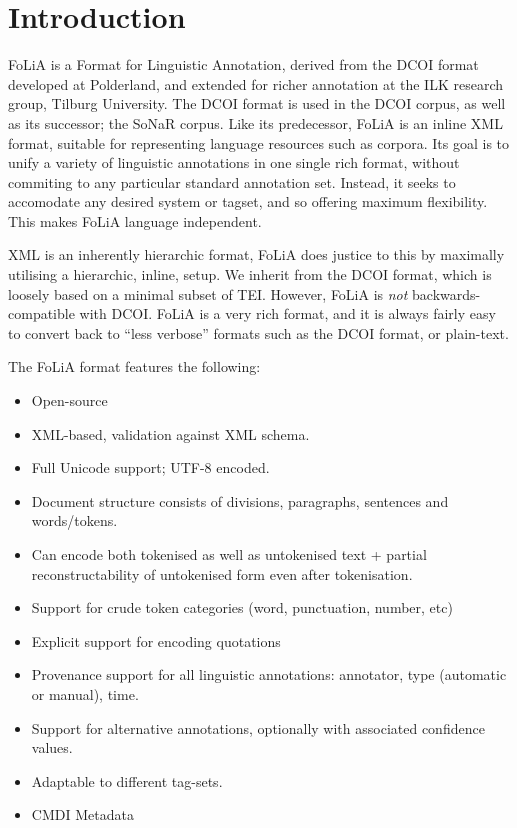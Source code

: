 \section{Introduction}


FoLiA is a Format for Linguistic Annotation, derived from the DCOI\cite{DCOI} format developed at Polderland, and extended for richer annotation at the ILK research group, Tilburg University. The DCOI format is used in the DCOI corpus, as well as its successor; the SoNaR corpus. Like its predecessor, FoLiA is an inline XML format, suitable for representing language resources such as corpora. Its goal is to unify a variety of linguistic annotations in one single rich format, without commiting to any particular standard annotation set. Instead, it seeks to accomodate any desired system or tagset, and so offering maximum flexibility. This makes FoLiA language independent.

XML is an inherently hierarchic format, FoLiA does justice to this by maximally utilising a hierarchic, inline, setup. We inherit from the DCOI format, which is loosely based on a minimal subset of TEI. However, FoLiA is \emph{not} backwards-compatible with DCOI. FoLiA is a very rich format, and it is always fairly easy to convert back to ``less verbose'' formats such as the DCOI format, or plain-text. 

The FoLiA format features the following:

\begin{itemize}
\item Open-source
\item XML-based, validation against XML schema.
\item Full Unicode support; UTF-8 encoded.
\item Document structure consists of divisions, paragraphs, sentences and words/tokens.
\item Can encode both tokenised as well as untokenised text + partial reconstructability of untokenised form even after tokenisation.
\item Support for crude token categories (word, punctuation, number, etc)
\item Explicit support for encoding quotations
\item Provenance support for all linguistic annotations: annotator, type (automatic or manual), time.
\item Support for alternative annotations, optionally with associated confidence values.
\item Adaptable to different tag-sets.
\item CMDI Metadata
\end{itemize}

